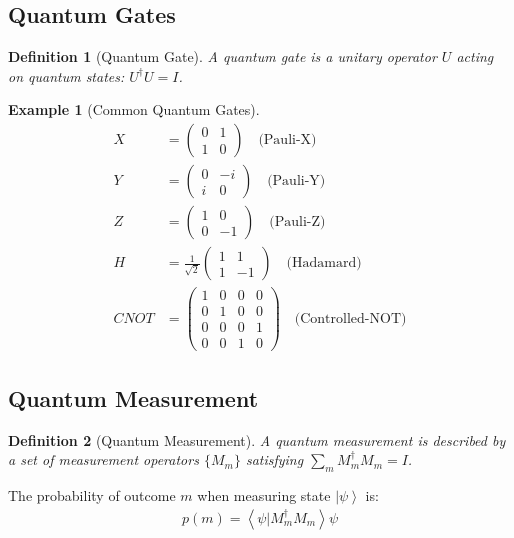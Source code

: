 \documentclass[11pt]{article}
\newtheorem{definition}{Definition}[section]
\newtheorem{example}{Example}[section]
\newcommand{\ket}[1]{\left|#1\right\rangle}
\newcommand{\braket}[2]{\left\langle#1|#2\right\rangle}
\begin{document}
\subsection{Quantum Gates}

\begin{definition}[Quantum Gate]
A quantum gate is a unitary operator $U$ acting on quantum states: $U^\dagger U = I$.
\end{definition}

\begin{example}[Common Quantum Gates]
\begin{align}
X &= \begin{pmatrix} 0 & 1 \\ 1 & 0 \end{pmatrix} \quad \text{(Pauli-X)} \\
Y &= \begin{pmatrix} 0 & -i \\ i & 0 \end{pmatrix} \quad \text{(Pauli-Y)} \\
Z &= \begin{pmatrix} 1 & 0 \\ 0 & -1 \end{pmatrix} \quad \text{(Pauli-Z)} \\
H &= \frac{1}{\sqrt{2}}\begin{pmatrix} 1 & 1 \\ 1 & -1 \end{pmatrix} \quad \text{(Hadamard)} \\
CNOT &= \begin{pmatrix} 1 & 0 & 0 & 0 \\ 0 & 1 & 0 & 0 \\ 0 & 0 & 0 & 1 \\ 0 & 0 & 1 & 0 \end{pmatrix} \quad \text{(Controlled-NOT)}
\end{align}
\end{example}

\subsection{Quantum Measurement}

\begin{definition}[Quantum Measurement]
A quantum measurement is described by a set of measurement operators $\{M_m\}$ satisfying $\sum_m M_m^\dagger M_m = I$.
\end{definition}

The probability of outcome $m$ when measuring state $\ket{\psi}$ is:
\begin{align}
p(m) = \braket{\psi}{M_m^\dagger M_m}{\psi}
\end{align}
\end{document}
